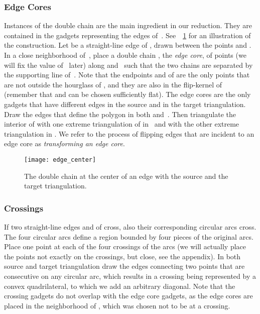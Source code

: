 \documentclass[11pt,a4paper]{article}
\begin{document}
\subsubsection{Edge Cores}
Instances of the double chain are the main ingredient in our reduction.
They are contained in the gadgets representing the edges of~.
See~\figurename~\ref{fig_edge_center} for an illustration of the construction.
Let  be a straight-line edge of , drawn between the points  and .
In a close neighborhood of~, place a double chain , the \emph{edge core}, of  points (we will fix the value of~ later) along  and~ such that the two chains are separated by the supporting line of~.
Note that the endpoints  and  of  are the only points that are not outside the hourglass of , and they are also in the flip-kernel of~ (remember that  and  can be chosen sufficiently flat).
The edge cores are the only gadgets that have different edges in the source and in the target triangulation.
Draw the edges that define the polygon  in both  and~.
Then triangulate the interior of  with one extreme triangulation of  in~ and with the other extreme triangulation in .
We refer to the process of flipping edges that are incident to an edge core as \emph{transforming an edge core}.

\begin{figure}
\centering
\texttt{[image: edge\_center]}
\caption{The double chain at the center of an edge with the source and the target triangulation.}
\label{fig_edge_center}
\end{figure}


\subsubsection{Crossings}
If two straight-line edges  and  of  cross, also their corresponding circular arcs cross.
The four circular arcs define a region bounded by four pieces of the original arcs.
Place one point at each of the four crossings of the arcs (we will actually place the points not exactly on the crossings, but close, see the appendix).
In both source and target triangulation draw the edges connecting two points that are consecutive on any circular arc, which results in a crossing being represented by a convex quadrilateral, to which we add an arbitrary diagonal.
Note that the crossing gadgets do not overlap with the edge core gadgets, as the edge cores are placed in the neighborhood of , which was chosen not to be at a crossing.
\end{document}
